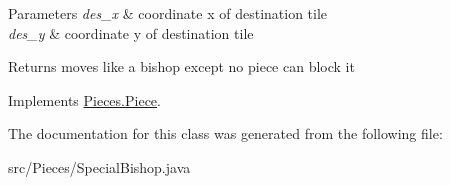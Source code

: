 \begin{DoxyParams}{Parameters}
{\em des\-\_\-x} & coordinate x of destination tile \\
\hline
{\em des\-\_\-y} & coordinate y of destination tile \\
\hline
\end{DoxyParams}
\begin{DoxyReturn}{Returns}
moves like a bishop except no piece can block it 
\end{DoxyReturn}


Implements \hyperlink{classPieces_1_1Piece}{Pieces.\-Piece}.



The documentation for this class was generated from the following file\-:\begin{DoxyCompactItemize}
\item 
src/\-Pieces/Special\-Bishop.\-java\end{DoxyCompactItemize}
